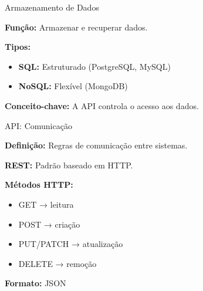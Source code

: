 \documentclass{beamer}
\begin{document}
\begin{frame}{Armazenamento de Dados}

\textbf{Função:} Armazenar e recuperar dados.

\vspace{0.3cm}
\textbf{Tipos:}
\begin{itemize}
\item \textbf{SQL:} Estruturado (PostgreSQL, MySQL)
\item \textbf{NoSQL:} Flexível (MongoDB)
\end{itemize}

\vspace{0.3cm}
\textbf{Conceito-chave:} A API controla o acesso aos dados.

\end{frame}

\begin{frame}{API: Comunicação}

\textbf{Definição:} Regras de comunicação entre sistemas.

\vspace{0.2cm}
\textbf{REST:} Padrão baseado em HTTP.

\vspace{0.2cm}
\textbf{Métodos HTTP:}
\begin{itemize}
\item GET → leitura
\item POST → criação
\item PUT/PATCH → atualização
\item DELETE → remoção
\end{itemize}

\vspace{0.3cm}
\textbf{Formato:} JSON

\end{frame}
\end{document}
